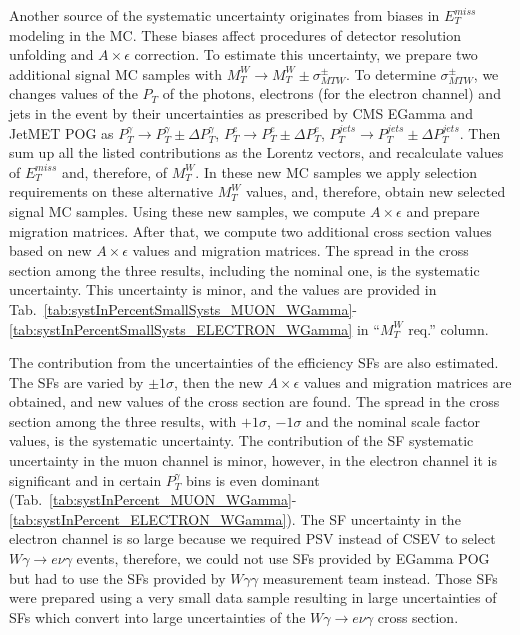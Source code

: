 
Another source of the systematic uncertainty originates from biases in $E_T^{miss}$ modeling in the MC. These biases affect procedures of detector resolution unfolding and $A\times\epsilon$ correction. To estimate this uncertainty, we prepare two additional signal MC samples with $M_T^{W} \rightarrow M_T^W \pm \sigma^{\pm}_{MTW}$. To determine $\sigma^{\pm}_{MTW}$, we changes values of the $P_T$ of the photons, electrons (for the electron channel) and jets in the event by their uncertainties as prescribed by CMS EGamma and JetMET POG as $P_T^{\gamma}\rightarrow P_T^{\gamma} \pm \Delta P_T^{\gamma}$, $P_T^{e}\rightarrow P_T^{e} \pm \Delta P_T^{e}$, $P_T^{jets}\rightarrow P_T^{jets} \pm \Delta P_T^{jets}$. Then sum up all the listed contributions as the Lorentz vectors, and recalculate values of $E_T^{miss}$ and, therefore, of $M_T^{W}$. In these new MC samples we apply selection requirements on these alternative $M_T^W$ values, and, therefore, obtain new selected signal MC samples. Using these new samples, we compute $A \times \epsilon$ and prepare migration matrices. After that, we compute two additional cross section values based on new $A\times\epsilon$ values and migration matrices. The spread in the cross section among the three results, including the nominal one, is the systematic uncertainty. This uncertainty is minor, and the values are provided in Tab.~\ref{tab:systInPercentSmallSysts_MUON_WGamma}-\ref{tab:systInPercentSmallSysts_ELECTRON_WGamma} in ``$M_T^W$ req.'' column.


The contribution from the uncertainties of the efficiency SFs are also estimated. The SFs are varied by $\pm 1\sigma$, then the new $A \times \epsilon$ values and migration matrices are obtained, and new values of the cross section are found. The spread in the cross section among the three results, with $+1\sigma$, $-1\sigma$ and the nominal scale factor values, is the systematic uncertainty. The contribution of the SF systematic uncertainty in the muon channel is minor, however, in the electron channel it is significant and in certain $P_T^{\gamma}$ bins is even dominant (Tab.~\ref{tab:systInPercent_MUON_WGamma}-\ref{tab:systInPercent_ELECTRON_WGamma}). The SF uncertainty in the electron channel is so large because we required PSV instead of CSEV to select $W\gamma\rightarrow e\nu\gamma$ events, therefore, we could not use SFs provided by EGamma POG but had to use the SFs provided by $W\gamma\gamma$ measurement team instead. Those SFs were prepared using a very small data sample resulting in large uncertainties of SFs which convert into large uncertainties of the $W\gamma\rightarrow e\nu\gamma$ cross section. 

